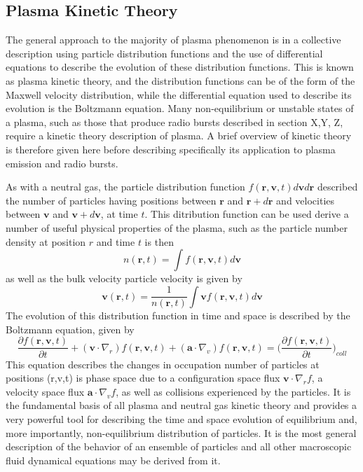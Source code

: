 \subsection{Plasma Kinetic Theory}\label{sec:11}

The general approach to the majority of plasma phenomenon is in a collective description using particle distribution functions and the use of differential equations to describe the evolution of these distribution functions. This is known as plasma kinetic theory, and the distribution functions can be of the form of the Maxwell velocity distribution, while the differential equation used to describe its evolution is the Boltzmann equation. Many non-equilibrium or unstable states of a plasma, such as those that produce radio bursts described in section X,Y, Z, require a kinetic theory description of plasma. A brief overview of kinetic theory is therefore given here before describing specifically its application to plasma emission and radio bursts.

As with a neutral gas, the particle distribution function $f(\mathbf{r}, \mathbf{v}, t)d\mathbf{v}d\mathbf{r}$ described the number of particles having positions between $\mathbf{r}$ and $\mathbf{r}+d\mathbf{r}$ and velocities between $\mathbf{v}$ and $\mathbf{v}+d\mathbf{v}$, at time $t$. This ditribution function can be used derive a number of useful physical properties of the plasma, such as the particle number density at position $r$ and time $t$ is then
\begin{equation}
n(\mathbf{r},t) = \int f(\mathbf{r}, \mathbf{v},t) d \mathbf{v}
\label{eqn:num_density}
\end{equation}
as well as the bulk velocity particle velocity is given by
\begin{equation}
 \mathbf{v}(\mathbf{r},t) = \frac{1}{n(\mathbf{r},t)}\int  \mathbf{v} f(\mathbf{r}, \mathbf{v},t) d \mathbf{v}
\label{eqn:bulk_flow}
\end{equation}
The evolution of this distribution function in time and space is described by the Boltzmann equation, given by
\begin{equation}
\frac{\partial f(\mathbf{r}, \mathbf{v},t)}{\partial t}  +     ( \mathbf{v}\cdot\nabla_r)f(\mathbf{r}, \mathbf{v},t)    + (\mathbf{a}\cdot\nabla_v)f(\mathbf{r}, \mathbf{v},t) = \bigg(\frac{\partial f(\mathbf{r}, \mathbf{v},t)}{\partial t}\bigg)_{coll}
\end{equation}
This equation describes the changes in occupation number of particles at positions (r,v,t) is phase space due to a configuration space flux $\mathbf{v}\cdot\nabla_rf$, a velocity space flux $ \mathbf{a}\cdot\nabla_vf$, as well as collisions experienced by the particles. It is the fundamental basis of all plasma and neutral gas kinetic theory and provides a very powerful tool for describing the time and space evolution of equilibrium and, more importantly, non-equilibrium distribution of particles. It is the most general description of the behavior of an ensemble of particles and all other macroscopic fluid dynamical equations may be derived from it.

